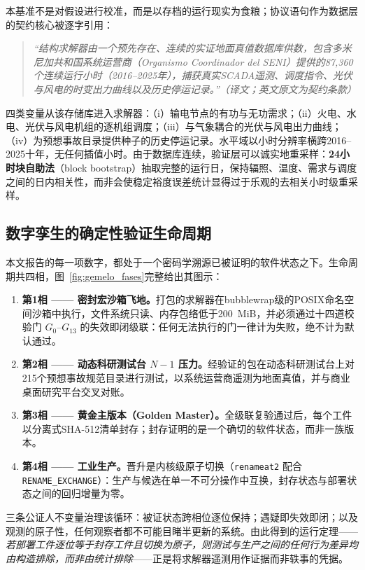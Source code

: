 本基准不是对假设进行校准，而是以存档的运行现实为食粮；协议语句作为数据层的契约核心被逐字引用：
\begin{quote}
\itshape “结构求解器由一个预先存在、连续的实证地面真值数据库供数，包含多米尼加共和国系统运营商（Organismo Coordinador del SENI）提供的87,360个连续运行小时（2016--2025年），捕获真实SCADA遥测、调度指令、光伏与风电的时变出力曲线以及历史停运记录。”（译文；英文原文为契约条款）
\end{quote}

四类变量从该存储库进入求解器：（i）输电节点的有功与无功需求；（ii）火电、水电、光伏与风电机组的逐机组调度；（iii）与气象耦合的光伏与风电出力曲线；（iv）为预想事故目录提供种子的历史停运记录。水平域以小时分辨率横跨2016--2025十年，无任何插值小时。由于数据库连续，验证层可以诚实地重采样：\textbf{24小时块自助法}（block bootstrap）抽取完整的运行日，保持辐照、温度、需求与调度之间的日内相关性，而非会使稳定裕度误差统计显得过于乐观的去相关小时级重采样。

\subsection{数字孪生的确定性验证生命周期}
\label{sub:lifecycle}

本文报告的每一项数字，都处于一个密码学溯源已被证明的软件状态之下。生命周期共四相，图~\ref{fig:gemelo_fases}完整给出其图示：
\begin{enumerate}
\item \textbf{第1相 —— 密封宏沙箱飞地。}打包的求解器在bubblewrap级的POSIX命名空间沙箱中执行，文件系统只读、内存包络低于200~MiB，并必须通过十四道校验门 $G_0$--$G_{13}$ 的失效即闭级联：任何无法执行的门一律计为失败，绝不计为默认通过。
\item \textbf{第2相 —— 动态科研测试台 $N-1$ 压力。}经验证的包在动态科研测试台上对215个预想事故规范目录进行测试，以系统运营商遥测为地面真值，并与商业桌面研究平台交叉对账。
\item \textbf{第3相 —— 黄金主版本（Golden Master）。}全级联复验通过后，每个工件以分离式SHA-512清单封存；封存证明的是一个确切的软件状态，而非一族版本。
\item \textbf{第4相 —— 工业生产。}晋升是内核级原子切换（\texttt{renameat2} 配合 \texttt{RENAME\_EXCHANGE}）：生产与候选在单一不可分操作中互换，封存状态与部署状态之间的回归增量为零。
\end{enumerate}

三条公证人不变量治理该循环：被证状态跨相位逐位保持；遇疑即失效即闭；以及观测的原子性，任何观察者都不可能目睹半更新的系统。由此得到的运行定理——\emph{若部署工件逐位等于封存工件且切换为原子，则测试与生产之间的任何行为差异均由构造排除，而非由统计排除}——正是将求解器遥测用作证据而非轶事的凭据。


